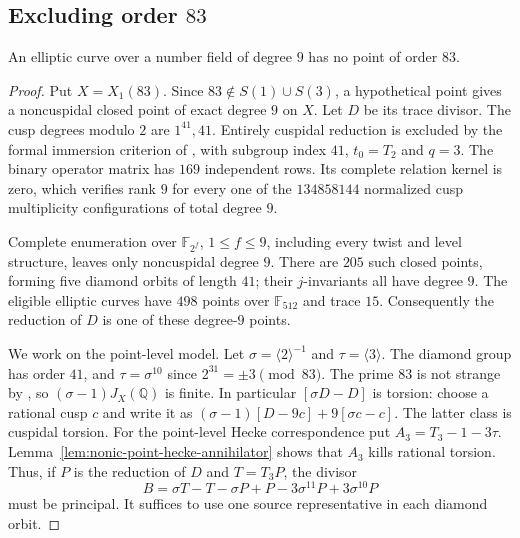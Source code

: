 \subsection{Excluding order $83$}
\begin{proposition}\label{prop:nonic83-exclusion}
An elliptic curve over a number field of degree $9$ has no point of
order $83$.
\end{proposition}
\begin{proof}
Put $X=X_1(83)$. Since $83\notin S(1)\cup S(3)$, a hypothetical
point gives a noncuspidal closed point of exact degree $9$ on $X$.
Let $D$ be its trace divisor. The cusp degrees modulo $2$ are
$1^{41},41$. Entirely cuspidal reduction is excluded by the formal
immersion criterion of
\cite[Corollaries~4.4 and~5.2, Proposition~5.3]{DKSS}, with subgroup
index $41$, $t_0=T_2$ and $q=3$.
The binary operator matrix has $169$ independent rows. Its complete
relation kernel is zero, which verifies rank $9$ for every one of
the $134858144$ normalized cusp multiplicity configurations of total
degree $9$.

Complete enumeration over $\mathbb F_{2^f}$, $1\leq f\leq9$,
including every twist and level structure, leaves only
noncuspidal degree $9$. There are $205$ such closed points, forming
five diamond orbits of length $41$; their $j$-invariants all have
degree $9$. The eligible elliptic curves have $498$ points over
$\mathbb F_{512}$ and trace $15$.
Consequently the reduction of $D$ is one of these degree-$9$ points.

We work on the point-level model. Let
$\sigma=\langle2\rangle^{-1}$ and $\tau=\langle3\rangle$.
The diamond group has order $41$, and $\tau=\sigma^{10}$ since
$2^{31}=\pm3\pmod {83}$.
The prime $83$ is not strange by
\cite[Proposition~5.2 and Table~2]{DSPrime}, so
$(\sigma-1)J_X(\mathbb Q)$ is finite.
In particular $[\sigma D-D]$ is torsion: choose a rational cusp $c$
and write it as $(\sigma-1)[D-9c]+9[\sigma c-c]$.
The latter class is cuspidal torsion.
For the point-level Hecke correspondence put
$A_3=T_3-1-3\tau$.
Lemma~\ref{lem:nonic-point-hecke-annihilator} shows that $A_3$ kills rational torsion.
Thus, if $P$ is the reduction of $D$ and $T=T_3P$, the divisor
\[
 B=\sigma T-T-\sigma P+P-3\sigma^{11}P+3\sigma^{10}P
\]
must be principal.
It suffices to use one source representative in each diamond orbit.


\end{proof}
